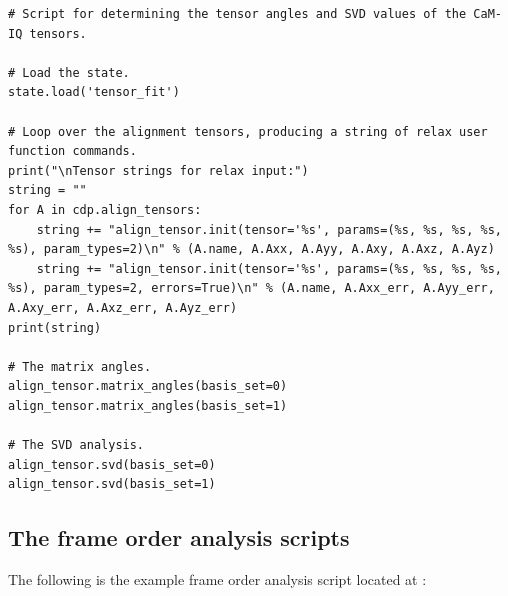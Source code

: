 \begin{lstlisting}
# Script for determining the tensor angles and SVD values of the CaM-IQ tensors.

# Load the state.
state.load('tensor_fit')

# Loop over the alignment tensors, producing a string of relax user function commands.
print("\nTensor strings for relax input:")
string = ""
for A in cdp.align_tensors:
    string += "align_tensor.init(tensor='%s', params=(%s, %s, %s, %s, %s), param_types=2)\n" % (A.name, A.Axx, A.Ayy, A.Axy, A.Axz, A.Ayz)
    string += "align_tensor.init(tensor='%s', params=(%s, %s, %s, %s, %s), param_types=2, errors=True)\n" % (A.name, A.Axx_err, A.Ayy_err, A.Axy_err, A.Axz_err, A.Ayz_err)
print(string)

# The matrix angles.
align_tensor.matrix_angles(basis_set=0)
align_tensor.matrix_angles(basis_set=1)

# The SVD analysis.
align_tensor.svd(basis_set=0)
align_tensor.svd(basis_set=1)
\end{lstlisting}


\subsection{The frame order analysis scripts}
\label{sect: frame order analysis script}

The following is the example frame order analysis script located at :

